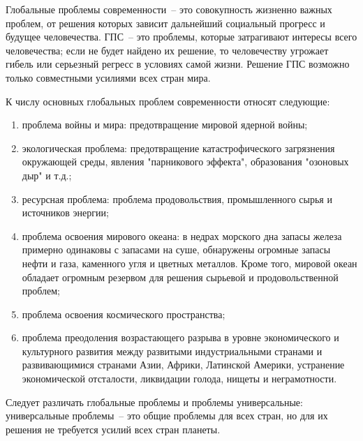 Глобальные проблемы современности~-- это совокупность жизненно важных проблем, от решения
которых зависит дальнейший социальный прогресс и будущее человечества. ГПС~-- это
проблемы, которые затрагивают интересы всего человечества; если не будет найдено их
решение, то человечеству угрожает гибель или серьезный регресс в условиях самой жизни.
Решение ГПС возможно только совместными усилиями всех стран мира. 

К числу основных глобальных проблем современности относят следующие:
\begin{enumerate}
    \itemsep-1ex
    \vspace*{-1ex}
    \item проблема войны и мира: предотвращение мировой ядерной войны;
    \item экологическая проблема: предотвращение катастрофического загрязнения окружающей
        среды, явления "парникового эффекта", образования "озоновых дыр" и т.д.;
    \item ресурсная проблема: проблема продовольствия, промышленного сырья и источников
        энергии;
    \item проблема освоения мирового океана: в недрах морского дна запасы железа примерно
        одинаковы с запасами на суше, обнаружены огромные запасы нефти и газа, каменного
        угля и цветных металлов. Кроме того, мировой океан обладает огромным резервом для
        решения сырьевой и продовольственной проблем;
    \item проблема освоения космического пространства;
    \item проблема преодоления возрастающего разрыва в уровне экономического и культурного
        развития между развитыми индустриальными странами и развивающимися странами Азии,
        Африки, Латинской Америки, устранение экономической отсталости, ликвидации голода,
        нищеты и неграмотности. 
\end{enumerate}

Следует различать глобальные проблемы и проблемы универсальные: универсальные проблемы~--
это общие проблемы для всех стран, но для их решения не требуется усилий всех стран планеты.
